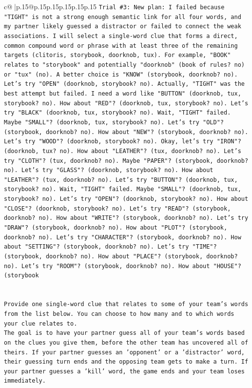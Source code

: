 \documentclass{article}
\begin{document}
{\begin{supertabular}{c@{$\;$}|p{.15\linewidth}@{}p{.15\linewidth}p{.15\linewidth}p{.15\linewidth}p{.15\linewidth}p{.15\linewidth}}
{{{\texttt{Trial \#3: New plan: I failed because "TIGHT" is not a strong enough semantic link for all four words, and my partner likely guessed a distractor or failed to connect the weak associations. I will select a single{-}word clue that forms a direct, common compound word or phrase with at least three of the remaining targets (clitoris, storybook, doorknob, tux). For example, "BOOK" relates to "storybook" and potentially "doorknob" (book of rules? no) or "tux" (no). A better choice is "KNOW" (storybook, doorknob? no). Let's try "OPEN" (doorknob, storybook? no). Actually, "TIGHT" was the best attempt but failed. I need a word like "BUTTON" (doorknob, tux, storybook? no). How about "RED"? (doorknob, tux, storybook? no). Let's try "BLACK" (doorknob, tux, storybook? no). Wait, "TIGHT" failed. Maybe "SMALL"? (doorknob, tux, storybook? no). Let's try "OLD"? (storybook, doorknob? no). How about "NEW"? (storybook, doorknob? no). Let's try "WOOD"? (doorknob, storybook? no). Okay, let's try "IRON"? (doorknob, tux? no). How about "LEATHER"? (tux, doorknob? no). Let's try "CLOTH"? (tux, doorknob? no). Maybe "PAPER"? (storybook, doorknob? no). Let's try "GLASS"? (doorknob, storybook? no). How about "LEATHER"? (tux, doorknob? no). Let's try "BUTTON"? (doorknob, tux, storybook? no). Wait, "TIGHT" failed. Maybe "SMALL"? (doorknob, tux, storybook? no). Let's try "OPEN"? (doorknob, storybook? no). How about "CLOSE"? (doorknob, storybook? no). Let's try "READ"? (storybook, doorknob? no). How about "WRITE"? (storybook, doorknob? no). Let's try "DRAW"? (storybook, doorknob? no). How about "PLOT"? (storybook, doorknob? no). Let's try "CHARACTER"? (storybook, doorknob? no). How about "SETTING"? (storybook, doorknob? no). Let's try "TIME"? (storybook, doorknob? no). How about "PLACE"? (storybook, doorknob? no). Let's try "ROOM"? (storybook, doorknob? no). How about "HOUSE"? (storybook} \\
\\ 
\\ 
\texttt{Provide one single{-}word clue that relates to some of your team's words from the list below. You can choose to how many and to which words your clue relates to.} \\
\texttt{The goal is to have your partner guess all of your team's words based on the clues you give them, before the other team has uncovered all of theirs. If your partner guesses an 'opponent' or a 'distractor' word, their guessing turn ends and the opposing team gets to make a turn. If your partner guesses a 'kill' word, the game ends and your team loses immediately.} \\
}}}
\end{supertabular}}
\end{document}
